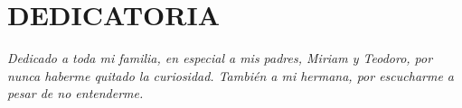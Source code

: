 \chapter*{\hfill DEDICATORIA}
\thispagestyle{empty}
\doublespacing
\begin{flushright}
\textit{Dedicado a toda mi familia, en especial a mis padres, Miriam y Teodoro, por nunca haberme quitado la curiosidad. También a mi hermana, por escucharme a pesar de no entenderme.}
\end{flushright}

